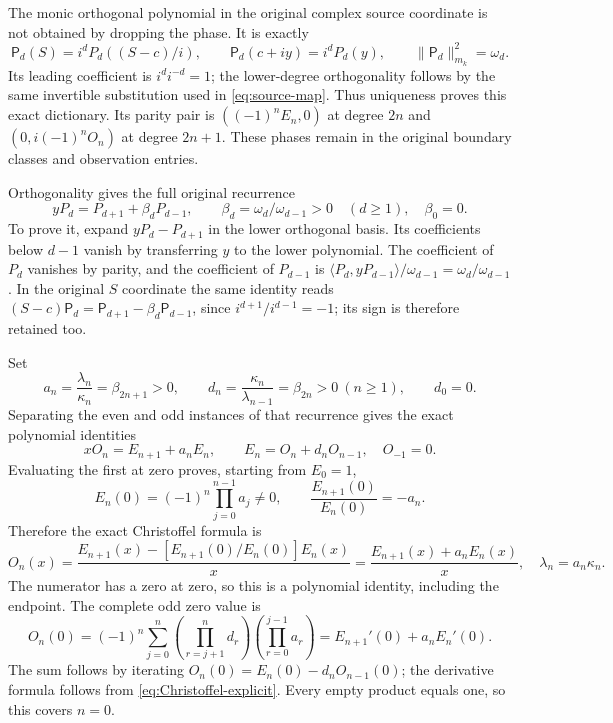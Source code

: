 \documentclass[11pt]{article}
\begin{document}
The monic orthogonal polynomial in the original complex source
coordinate is not obtained by dropping the phase. It is exactly
\begin{equation}\label{eq:S-polynomial-phase}
 \mathsf P_d(S)=i^dP_d((S-c)/i),\qquad
 \mathsf P_d(c+iy)=i^dP_d(y),\qquad
 \|\mathsf P_d\|_{m_k}^2=\omega_d.
\end{equation}
Its leading coefficient is $i^di^{-d}=1$; the lower-degree
orthogonality follows by the same invertible substitution used
in \eqref{eq:source-map}. Thus uniqueness proves this exact
dictionary. Its parity pair is $((-1)^nE_n,0)$ at degree $2n$
and $(0,i(-1)^nO_n)$ at degree $2n+1$. These phases remain in
the original boundary classes and observation entries.

Orthogonality gives the full original recurrence
\[
 yP_d=P_{d+1}+\beta_dP_{d-1},\qquad
 \beta_d=\omega_d/\omega_{d-1}>0\quad(d\geq1),\quad \beta_0=0.
\]
To prove it, expand $yP_d-P_{d+1}$ in the lower orthogonal basis.
Its coefficients below $d-1$ vanish by transferring $y$ to the
lower polynomial. The coefficient of $P_d$ vanishes by parity,
and the coefficient of $P_{d-1}$ is
$\langle P_d,yP_{d-1}\rangle/\omega_{d-1}=\omega_d/\omega_{d-1}$.
In the original $S$ coordinate the same identity reads
$(S-c)\mathsf P_d=\mathsf P_{d+1}-\beta_d\mathsf P_{d-1}$,
since $i^{d+1}/i^{d-1}=-1$; its sign is therefore retained too.

Set
\begin{equation}\label{eq:ad}
 a_n=\frac{\lambda_n}{\kappa_n}=\beta_{2n+1}>0,
 \qquad d_n=\frac{\kappa_n}{\lambda_{n-1}}=\beta_{2n}>0\ (n\geq1),
 \qquad d_0=0.
\end{equation}
Separating the even and odd instances of that recurrence gives
the exact polynomial identities
\begin{equation}\label{eq:Christoffel}
 xO_n=E_{n+1}+a_nE_n,\qquad
 E_n=O_n+d_nO_{n-1},\quad O_{-1}=0.
\end{equation}
Evaluating the first at zero proves, starting from $E_0=1$,
\begin{equation}\label{eq:E0}
 E_n(0)=(-1)^n\prod_{j=0}^{n-1}a_j\ne0,
 \qquad \frac{E_{n+1}(0)}{E_n(0)}=-a_n.
\end{equation}
Therefore the exact Christoffel formula is
\begin{equation}\label{eq:Christoffel-explicit}
 O_n(x)=\frac{E_{n+1}(x)-[E_{n+1}(0)/E_n(0)]E_n(x)}x
        =\frac{E_{n+1}(x)+a_nE_n(x)}x,
 \quad \lambda_n=a_n\kappa_n.
\end{equation}
The numerator has a zero at zero, so this is a polynomial identity,
including the endpoint. The complete odd zero value is
\begin{equation}\label{eq:O0}
 O_n(0)=(-1)^n\sum_{j=0}^n
     \left(\prod_{r=j+1}^nd_r\right)
     \left(\prod_{r=0}^{j-1}a_r\right)
 =E_{n+1}'(0)+a_nE_n'(0).
\end{equation}
The sum follows by iterating $O_n(0)=E_n(0)-d_nO_{n-1}(0)$;
the derivative formula follows from \eqref{eq:Christoffel-explicit}.
Every empty product equals one, so this covers $n=0$.
\end{document}
